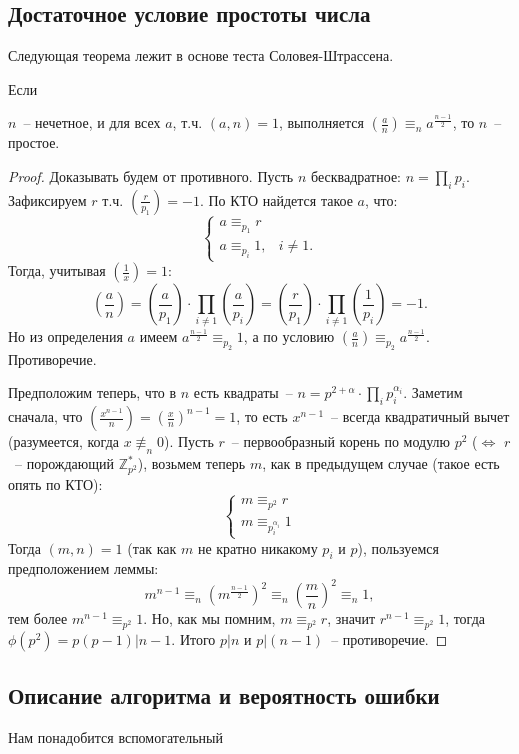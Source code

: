 \subsection{Достаточное условие простоты числа}
Следующая теорема лежит в основе теста Соловея-Штрассена.
\begin{theorem}\hypertarget{solovaytest}{Если} $n$~-- нечетное, и для всех $a$, т.ч. $(a,n)=1$, выполняется $\left(\frac{a}{n}\right)\equiv_n a^\frac{n-1}{2}$, то $n$~-- простое.
\end{theorem}
\begin{proof}
Доказывать будем от противного.
Пусть $n$ бесквадратное: $n=\prod_i p_i$. Зафиксируем $r$ т.ч. $\left(\frac{r}{p_1}\right)=-1$. По КТО найдется такое $a$, что:
$$\begin{cases}
a\equiv_{p_1} r\\
a\equiv_{p_i} 1, & i\ne1.
\end{cases}$$
Тогда, учитывая $\left(\frac{1}{x}\right) = 1$: $$\left(\frac{a}{n}\right)=\left(\frac{a}{p_1}\right)\cdot\prod_{i\ne1}\left(\frac{a}{p_i}\right)=\left(\frac{r}{p_1}\right)\cdot\prod_{i\ne1}\left(\frac{1}{p_i}\right)=-1.$$ Но из определения $a$ имеем $a^\frac{n-1}{2}\equiv_{p_2}1$, а по условию $\left(\frac{a}{n}\right)\equiv_{p_2} a^\frac{n-1}{2}$. Противоречие.

Предположим теперь, что в $n$ есть квадраты~-- $n=p^{2+\alpha}\cdot\prod_{i} p_i^{\alpha_i}$.
Заметим сначала, что $\left(\frac{x^{n-1}}{n}\right)=\left(\frac{x}{n}\right)^{n-1}=1$, то есть $x^{n-1}$~-- всегда квадратичный вычет (разумеется, когда $x\not\equiv_n 0$).
Пусть $r$~-- первообразный корень по модулю $p^2$ ($\iff$ $r$~-- порождающий $\mathbb Z_{p^2}^*$), возьмем теперь $m$, как в предыдущем случае (такое есть опять по КТО):
$$\begin{cases}
m\equiv_{p^2} r \\
m\equiv_{p_i^{\alpha_i}} 1
\end{cases}$$
Тогда $(m,n)=1$ (так как $m$ не кратно никакому $p_i$ и $p$), пользуемся предположением леммы:
$$m^{n-1}\equiv_n \left(m^\frac{n-1}{2}\right)^2\equiv_n \left(\frac{m}{n}\right)^2\equiv_n1,$$ тем более $m^{n-1}\equiv_{p^2}1$. Но, как мы помним, $m\equiv_{p^2}r$, значит $r^{n-1}\equiv_{p^2}1$, тогда $\phi(p^2)=p(p-1)|n-1$. Итого $p|n$ и $p|(n-1)$~-- противоречие.
\end{proof}

\subsection{Описание алгоритма и вероятность ошибки}
Нам понадобится вспомогательный

